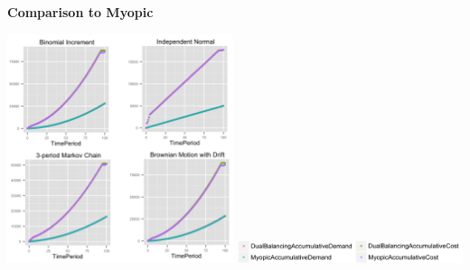\documentclass[twoside]{article}
\begin{document}
\begin{multicols}{2}
\begin{center}
  \textbf{Comparison to Myopic}
\end{center}
\begin{center}
  \label{figure:AccumulativeDemandAndCost}
  \includegraphics[width=2.6in]{figures/AccumulativeDemandAndCost.png}
  \includegraphics[width=2.6in]{figures/key.png}
\end{center}


\end{multicols}
\end{document}
